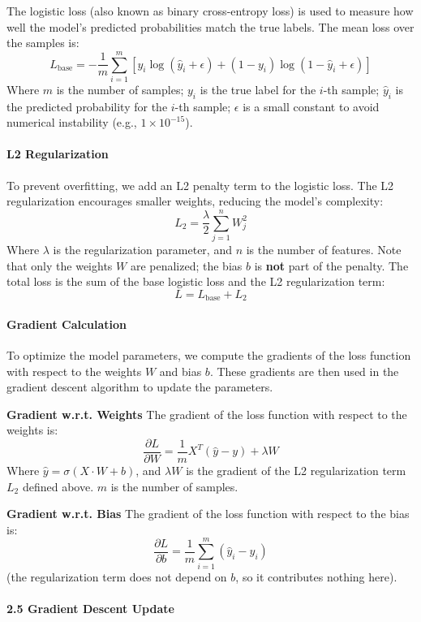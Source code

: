 \documentclass{article}
\begin{document}
The logistic loss (also known as binary cross-entropy loss) is used to measure how well the model's predicted probabilities match the true labels. The mean loss over the samples is:
\[
L_{\text{base}} = - \frac{1}{m} \sum_{i=1}^{m} \left[ y_i \log(\hat{y}_i + \epsilon) + (1 - y_i) \log(1 - \hat{y}_i + \epsilon) \right]
\]
Where \(m\) is the number of samples; \(y_i\) is the true label for the \(i\)-th sample; \(\hat{y}_i\) is the predicted probability for the \(i\)-th sample; \(\epsilon\) is a small constant to avoid numerical instability (e.g., \(1 \times 10^{-15}\)).


\paragraph{L2 Regularization}

To prevent overfitting, we add an L2 penalty term to the logistic loss. The L2 regularization encourages smaller weights, reducing the model's complexity:
\[
L_2 = \frac{\lambda}{2} \sum_{j=1}^{n} W_j^2
\]
Where \(\lambda\) is the regularization parameter, and \(n\) is the number of features. Note that only the weights \(W\) are penalized; the bias \(b\) is \textbf{not} part of the penalty. The total loss is the sum of the base logistic loss and the L2 regularization term:
\[
L = L_{\text{base}} + L_2
\]

\paragraph{Gradient Calculation}

To optimize the model parameters, we compute the gradients of the loss function with respect to the weights \(W\) and bias \(b\). These gradients are then used in the gradient descent algorithm to update the parameters.

\textbf{Gradient w.r.t. Weights} 
The gradient of the loss function with respect to the weights is:
\[
\frac{\partial L}{\partial W} = \frac{1}{m} X^T (\hat{y} - y) + \lambda W
\]
Where \(\hat{y} = \sigma(X \cdot W + b)\), and \(\lambda W\) is the gradient of the L2 regularization term \(L_2\) defined above. $m$ is the number of samples.

\textbf{Gradient w.r.t. Bias} 
The gradient of the loss function with respect to the bias is:
\[
\frac{\partial L}{\partial b} = \frac{1}{m} \sum_{i=1}^{m} (\hat{y}_i - y_i)
\]
(the regularization term does not depend on \(b\), so it contributes nothing here).

\paragraph{2.5 Gradient Descent Update}
\end{document}
